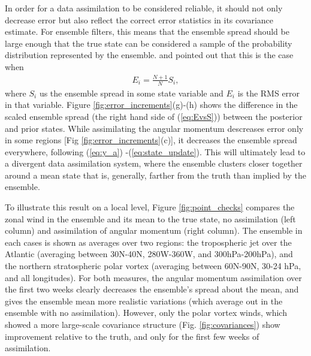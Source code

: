 In order for a data assimilation to be considered reliable, it should not only 
decrease error but also reflect the correct error statistics in its covariance 
estimate. 
For ensemble filters, this means that the ensemble spread should be large 
enough that the true state can be considered  a sample of the probability 
distribution represented by the ensemble.
 \citet{Huntley2009} and \citet{Murphy1988} pointed out that this is the case when 
 \begin{eqnarray}
	 E_i = \frac{N+1}{N} S_i, 
	 \label{eq:EvsS}
 \end{eqnarray}
where $S_i$ us the ensemble spread in some state variable and $E_i$ is the RMS error in that variable. 
Figure \ref{fig:error_increments}(g)-(h) shows the difference in the scaled ensemble spread (the right hand side of (\ref{eq:EvsS})) between the posterior and prior states. 
While assimilating the angular momentum descreases error only in some regions [Fig \ref{fig:error_increments}(c)], it decreases the ensemble spread everywhere, 
following (\ref{eq:y_a}) -(\ref{eq:state_update}).  
This will ultimately lead to a divergent data assimilation system, where the ensemble clusters closer together around a mean state that is, generally, farther from the truth than implied by the ensemble. 


To illustrate this result on a local level, Figure \ref{fig:point_checks} compares the zonal wind in the ensemble and its mean to the true state, no assimilation (left column) and assimilation of angular momentum (right column). 
The ensemble in each cases is shown as averages over two regions: the tropospheric jet over the Atlantic (averaging between 30N-40N, 280W-360W, and 300hPa-200hPa), and the northern stratospheric polar vortex (averaging between 60N-90N, 30-24 hPa, and all longitudes).
For both measures, the angular momentum assimilation over the first two weeks clearly decreases the ensemble's spread about the mean, and gives the ensemble mean more realistic variations (which average out in the ensemble with no assimilation). 
However, only the polar vortex winds, which showed a more large-scale covariance structure (Fig. \ref{fig:covariances}) show improvement relative to the truth, and only for the first few weeks of assimilation. 

